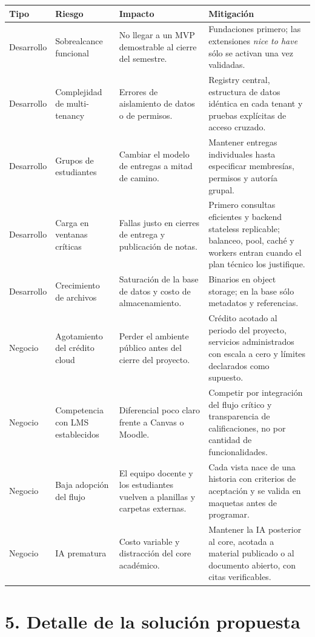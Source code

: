 \documentclass[letterpaper,10pt]{article}
\begin{document}
{\small
\begin{tabularx}{\textwidth}{|p{1.55cm}|p{2.9cm}|Y|Y|}
\hline
\textbf{Tipo} & \textbf{Riesgo} & \textbf{Impacto} & \textbf{Mitigación} \\
\hline
Desarrollo & Sobrealcance funcional & No llegar a un MVP demostrable al cierre del semestre. & Fundaciones primero; las extensiones \emph{nice to have} sólo se activan una vez validadas. \\
\hline
Desarrollo & Complejidad de multi-tenancy & Errores de aislamiento de datos o de permisos. & Registry central, estructura de datos idéntica en cada tenant y pruebas explícitas de acceso cruzado. \\
\hline
Desarrollo & Grupos de estudiantes & Cambiar el modelo de entregas a mitad de camino. & Mantener entregas individuales hasta especificar membresías, permisos y autoría grupal. \\
\hline
Desarrollo & Carga en ventanas críticas & Fallas justo en cierres de entrega y publicación de notas. & Primero consultas eficientes y backend stateless replicable; balanceo, pool, caché y workers entran cuando el plan técnico los justifique. \\
\hline
Desarrollo & Crecimiento de archivos & Saturación de la base de datos y costo de almacenamiento. & Binarios en object storage; en la base sólo metadatos y referencias. \\
\hline
Negocio & Agotamiento del crédito cloud & Perder el ambiente público antes del cierre del proyecto. & Crédito acotado al periodo del proyecto, servicios administrados con escala a cero y límites declarados como supuesto. \\
\hline
Negocio & Competencia con LMS establecidos & Diferencial poco claro frente a Canvas o Moodle. & Competir por integración del flujo crítico y transparencia de calificaciones, no por cantidad de funcionalidades. \\
\hline
Negocio & Baja adopción del flujo & El equipo docente y los estudiantes vuelven a planillas y carpetas externas. & Cada vista nace de una historia con criterios de aceptación y se valida en maquetas antes de programar. \\
\hline
Negocio & IA prematura & Costo variable y distracción del core académico. & Mantener la IA posterior al core, acotada a material publicado o al documento abierto, con citas verificables. \\
\hline
\end{tabularx}}

\section{5. Detalle de la solución propuesta}
\end{document}
